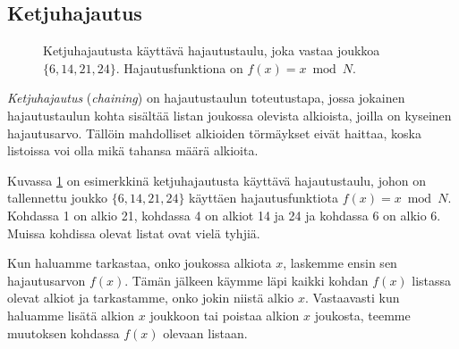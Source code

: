 \subsection{Ketjuhajautus}

\begin{figure}
\center
{}
\caption{Ketjuhajautusta käyttävä hajautustaulu, joka vastaa joukkoa $\{6,14,21,24\}$.
Hajautusfunktiona on $f(x)=x \bmod N$.}
\label{fig:hajtau}
\end{figure}


\emph{Ketjuhajautus} (\emph{chaining})
on hajautustaulun toteutustapa, jossa jokainen hajautustaulun kohta
sisältää listan joukossa olevista alkioista,
joilla on kyseinen hajautusarvo.
Tällöin mahdolliset alkioiden törmäykset eivät haittaa,
koska listoissa voi olla mikä tahansa määrä alkioita.

Kuvassa \ref{fig:hajtau} on esimerkkinä
ketjuhajautusta käyttävä hajautustaulu,
johon on tallennettu joukko $\{6,14,21,24\}$
käyttäen hajautusfunktiota $f(x)=x \bmod N$.
Kohdassa 1 on alkio 21, kohdassa 4 on alkiot 14 ja 24
ja kohdassa 6 on alkio 6.
Muissa kohdissa olevat listat ovat vielä tyhjiä.

Kun haluamme tarkastaa, onko joukossa alkiota $x$,
laskemme ensin sen hajautusarvon $f(x)$.
Tämän jälkeen käymme läpi kaikki kohdan $f(x)$
listassa olevat alkiot ja tarkastamme,
onko jokin niistä alkio $x$.
Vastaavasti kun haluamme lisätä alkion $x$ joukkoon
tai poistaa alkion $x$ joukosta,
teemme muutoksen kohdassa $f(x)$ olevaan listaan.

